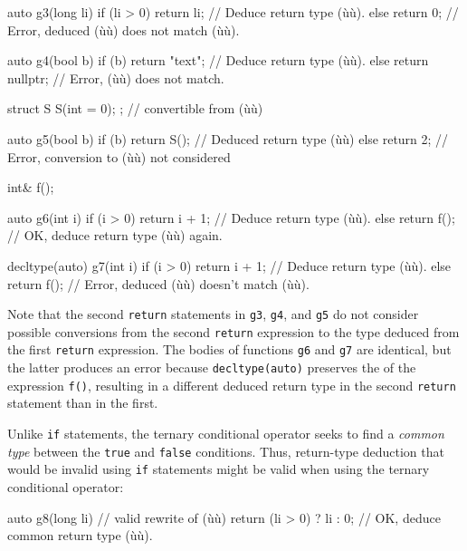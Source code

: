 \begin{emcppslisting}
auto g3(long li)
{
    if (li > 0) { return li; }   // Deduce return type (ù{}ù).
    else        { return 0;  }   // Error, deduced (ù{}ù) does not match (ù{}ù).
}

auto g4(bool b)
{
    if (b) { return "text"; }   // Deduce return type (ù{}ù).
    else   { return nullptr; }  // Error, (ù{}ù) does not match.
}

struct S { S(int = 0); };  // convertible from (ù{}ù)

auto g5(bool b)
{
    if (b) { return S(); }  // Deduced return type (ù{}ù)
    else   { return 2; }    // Error, conversion to (ù{}ù) not considered
}

int& f();

auto g6(int i)
{
    if (i > 0) { return i + 1; }  // Deduce return type (ù{}ù).
    else       { return f(); }    // OK, deduce return type (ù{}ù) again.
}

decltype(auto) g7(int i)
{
    if (i > 0) { return i + 1; }  // Deduce return type (ù{}ù).
    else       { return f(); }    // Error, deduced (ù{}ù) doesn't match (ù{}ù).
}
\end{emcppslisting}
    

\noindent Note that the second \lstinline!return! statements in \lstinline!g3!,
\lstinline!g4!, and \lstinline!g5! do not consider possible conversions from
the second \lstinline!return! expression to the type deduced from the first
\lstinline!return! expression. The bodies of functions \lstinline!g6! and
\lstinline!g7! are identical, but the latter produces an error because
\lstinline!decltype(auto)! preserves the  of the
expression \lstinline!f()!, resulting in a different deduced return type in
the second \lstinline!return! statement than in the first.

Unlike \lstinline!if! statements, the ternary conditional operator seeks to
find a \emph{common type} between the \lstinline!true! and \lstinline!false!
conditions. Thus, return-type deduction that would be invalid using
\lstinline!if! statements might be valid when using the ternary conditional
operator:

\begin{emcppslisting}
auto g8(long li)  // valid rewrite of (ù{}ù)
{
    return (li > 0) ? li : 0;  // OK, deduce common return type (ù{}ù).
}
\end{emcppslisting}
    

